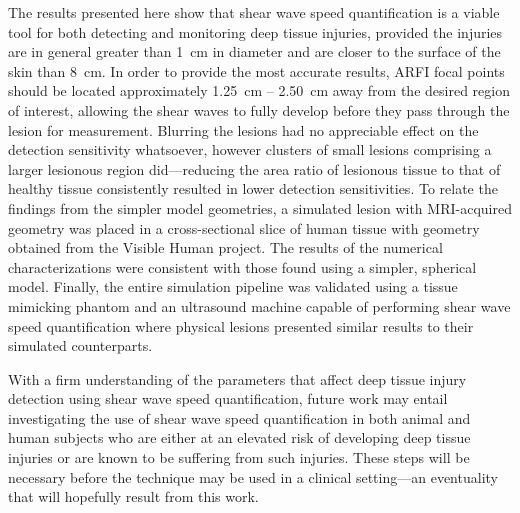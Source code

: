 		The results presented here show that shear wave speed quantification is a viable tool for both detecting and monitoring deep tissue injuries, provided the injuries are in general greater than \SI{1}{\cm} in diameter and are closer to the surface of the skin than \SI{8}{\cm}. In order to provide the most accurate results, ARFI focal points should be located approximately \SI{1.25}{\cm} -- \SI{2.50}{\cm} away from the desired region of interest, allowing the shear waves to fully develop before they pass through the lesion for measurement. Blurring the lesions had no appreciable effect on the detection sensitivity whatsoever, however clusters of small lesions comprising a larger lesionous region did---reducing the area ratio of lesionous tissue to that of healthy tissue consistently resulted in lower detection sensitivities. To relate the findings from the simpler model geometries, a simulated lesion with MRI-acquired geometry was placed in a cross-sectional slice of human tissue with geometry obtained from the Visible Human project. The results of the numerical characterizations were consistent with those found using a simpler, spherical model. Finally, the entire simulation pipeline was validated using a tissue mimicking phantom and an ultrasound machine capable of performing shear wave speed quantification where physical lesions presented similar results to their simulated counterparts.

		With a firm understanding of the parameters that affect deep tissue injury detection using shear wave speed quantification, future work may entail investigating the use of shear wave speed quantification in both animal and human subjects who are either at an elevated risk of developing deep tissue injuries or are known to be suffering from such injuries. These steps will be necessary before the technique may be used in a clinical setting---an eventuality that will hopefully result from this work.